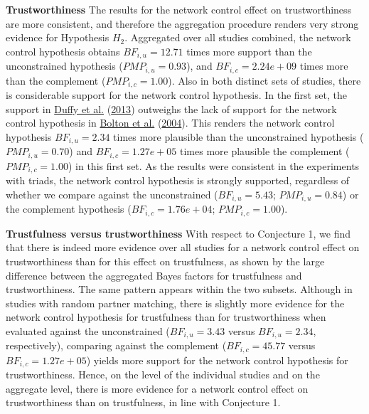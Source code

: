 \documentclass[
  11pt,
]{article}
\begin{document}
\textbf{Trustworthiness} \hspace{8pt}The results for the network control effect on trustworthiness are more consistent, and therefore the aggregation procedure renders very strong evidence for Hypothesis \(H_2\).
Aggregated over all studies combined, the network control hypothesis obtains \(BF_{i,u} = 12.71\) times more support than the unconstrained hypothesis (\(PMP_{i,u} = 0.93\)), and \(BF_{i,c} = 2.24e+09\) times more than the complement (\(PMP_{i,c} = 1.00\)).
Also in both distinct sets of studies, there is considerable support for the network control hypothesis.
In the first set, the support in \protect\hyperlink{ref-duffy2013social}{Duffy et al.} (\protect\hyperlink{ref-duffy2013social}{2013}) outweighs the lack of support for the network control hypothesis in \protect\hyperlink{ref-bolton_electronic_2004}{Bolton et al.} (\protect\hyperlink{ref-bolton_electronic_2004}{2004}).
This renders the network control hypothesis \(BF_{i,u} = 2.34\) times more plausible than the unconstrained hypothesis (\(PMP_{i,u} = 0.70\)) and \(BF_{i,c} = 1.27e+05\) times more plausible the complement (\(PMP_{i,c} = 1.00\)) in this first set.
As the results were consistent in the experiments with triads, the network control hypothesis is strongly supported, regardless of whether we compare against the unconstrained (\(BF_{i,u} = 5.43\); \(PMP_{i,u} = 0.84\)) or the complement hypothesis (\(BF_{i,c} = 1.76e+04\); \(PMP_{i,c} = 1.00\)).

\textbf{Trustfulness versus trustworthiness} \hspace{8pt} With respect to Conjecture 1, we find that there is indeed more evidence over all studies for a network control effect on trustworthiness than for this effect on trustfulness, as shown by the large difference between the aggregated Bayes factors for trustfulness and trustworthiness.
The same pattern appears within the two subsets.
Although in studies with random partner matching, there is slightly more evidence for the network control hypothesis for trustfulness than for trustworthiness when evaluated against the unconstrained (\(BF_{i,u} = 3.43\) versus \(BF_{i,u} = 2.34\), respectively), comparing against the complement (\(BF_{i,c} = 45.77\) versus \(BF_{i,c} = 1.27e+05\)) yields more support for the network control hypothesis for trustworthiness.
Hence, on the level of the individual studies and on the aggregate level, there is more evidence for a network control effect on trustworthiness than on trustfulness, in line with Conjecture 1.
\end{document}
